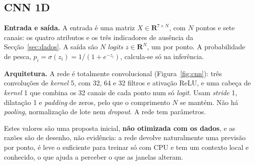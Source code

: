 \documentclass{article}
\begin{document}
\begin{center}
\label{fig:pipeline}
\end{center}

\subsection{CNN 1D}
\label{sec:cnn}

\textbf{Entrada e saída.} A entrada é uma matriz $X\in\mathbf{R}^{7\times N}$, com $N$ pontos e sete canais: os quatro atributos e os três indicadores de ausência da Secção~\ref{sec:dados}. A saída são $N$ \emph{logits} $z\in\mathbf{R}^{N}$, um por ponto. A probabilidade de pesca, $p_i=\sigma(z_i)=1/(1+e^{-z_i})$, calcula-se só na inferência.

\textbf{Arquitetura.} A rede é totalmente convolucional (Figura~\ref{fig:cnn}): três convoluções de \emph{kernel} 5, com 32, 64 e 32 filtros e ativação ReLU, e uma cabeça de \emph{kernel} 1 que combina os 32 canais de cada ponto num só \emph{logit}. Usam \emph{stride} 1, dilatação 1 e \emph{padding} de zeros, pelo que o comprimento $N$ se mantém. Não há \emph{pooling}, normalização de lote nem \emph{dropout}. A rede tem \resModParametros{} parâmetros.

Estes valores são uma proposta inicial, \textbf{não otimizada com os dados}, e as razões são de desenho, não evidência: a rede devolve naturalmente uma previsão por ponto, é leve o suficiente para treinar só com CPU e tem um contexto local e conhecido, o que ajuda a perceber o que as janelas alteram.
\end{document}
